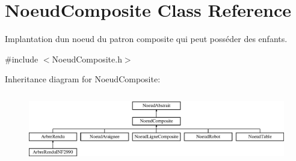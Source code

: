\hypertarget{class_noeud_composite}{}\section{Noeud\+Composite Class Reference}
\label{class_noeud_composite}


Implantation d\textquotesingle{}un noeud du patron composite qui peut posséder des enfants.  




{\ttfamily \#include $<$Noeud\+Composite.\+h$>$}

Inheritance diagram for Noeud\+Composite\+:\begin{figure}[H]
\begin{center}
\leavevmode
\includegraphics[height=3.068493cm]{class_noeud_composite}
\end{center}
\end{figure}
